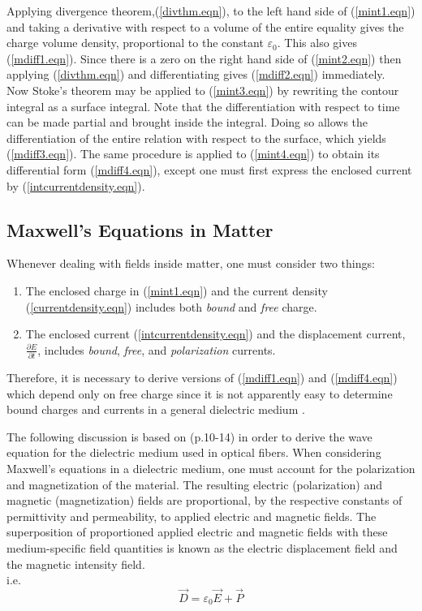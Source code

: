 \documentclass[12pt]{article}
\theoremstyle{definition}
\numberwithin{equation}{section}
\begin{document}
Applying divergence theorem,(\ref{divthm.eqn}), to the left hand side of (\ref{mint1.eqn}) and taking a derivative with respect to a volume of the entire equality gives the charge volume density, proportional to the constant $\varepsilon_{0}$. This also gives (\ref{mdiff1.eqn}). Since there is a zero on the right hand side of (\ref{mint2.eqn}) then applying (\ref{divthm.eqn}) and differentiating gives (\ref{mdiff2.eqn}) immediately.\\

Now Stoke's theorem may be applied to (\ref{mint3.eqn}) by rewriting the contour integral as a surface integral. Note that the differentiation with respect to time can be made partial and brought inside the integral. Doing so allows the differentiation of the entire relation with respect to the surface, which yields (\ref{mdiff3.eqn}). The same procedure is applied to (\ref{mint4.eqn}) to obtain its differential form (\ref{mdiff4.eqn}), except one must first express the enclosed current by (\ref{intcurrentdensity.eqn}).

\subsection{Maxwell's Equations in Matter}

Whenever dealing with fields inside matter, one must consider two things:

\begin{enumerate}
\item{The enclosed charge in (\ref{mint1.eqn}) and the current density (\ref{currentdensity.eqn}) includes both {\it bound} and {\it free} charge.}
\item{The enclosed current (\ref{intcurrentdensity.eqn}) and the displacement current, $\frac{\partial{E}}{\partial{t}}$, includes {\it bound}, {\it free}, and {\it polarization} currents.}
\end{enumerate}

Therefore, it is necessary to derive versions of (\ref{mdiff1.eqn}) and (\ref{mdiff4.eqn}) which depend only on free charge since it is not apparently easy to determine bound charges and currents in a general dielectric medium \cite{Flei}.

The following discussion is based on (p.10-14)\cite{Belanger} in order to derive the wave equation for the dielectric medium used in optical fibers. When considering Maxwell's equations in a dielectric medium, one must account for the polarization and magnetization of the material. The resulting electric (polarization) and magnetic (magnetization) fields are proportional, by the respective constants of permittivity and permeability, to applied electric and magnetic fields. The superposition of proportioned applied electric and magnetic fields with these medium-specific field quantities is known as the electric displacement field and the magnetic intensity field.\\
i.e.
\begin{equation}
\vec{D}=\varepsilon_{0}\vec{E} + \vec{P}
\label{dispfield.eqn}
\end{equation}
\end{document}
